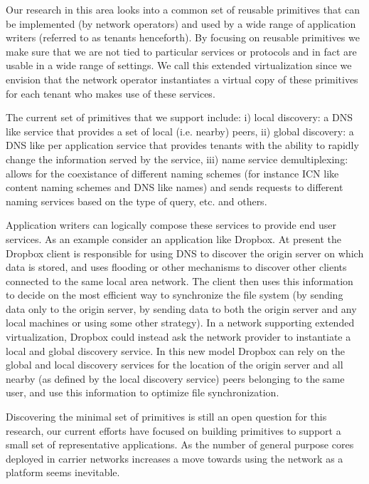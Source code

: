 \documentclass[letterpaper]{article}
\begin{document}
Our research in this area looks into a common set of reusable primitives that can be implemented (by network
operators) and used by a wide range of application writers (referred to as tenants henceforth). By focusing
on reusable primitives we make sure that we are not tied to particular services or protocols and in fact are
usable in a wide range of settings. We call this extended virtualization since we envision that the network
operator instantiates a virtual copy of these primitives for each tenant who makes use of these services.

The current set of primitives that we support include: i) local discovery: a DNS like service that provides a
set of local (i.e. nearby) peers, ii) global discovery: a DNS like per application service that provides
tenants with the ability to rapidly change the information served by the service, iii) name service
demultiplexing: allows for the coexistance of different naming schemes (for instance ICN like content naming
schemes and DNS like names) and sends requests to different naming services based on the type of query, etc.
and others.

Application writers can logically compose these services to provide end user services. As an example consider
an application like Dropbox. At present the Dropbox client is responsible for using DNS to discover the
origin server on which data is stored, and uses flooding or other mechanisms to discover other clients connected to
the same local area network. The client then uses this information to decide on the most efficient way to
synchronize the file system (by sending data only to the origin server, by sending data to both the origin
server and any local machines or using some other strategy). In a network supporting extended virtualization,
Dropbox could instead ask the network provider to instantiate a local and global discovery service. In this
new model Dropbox can rely on the global and local discovery services for the location of the origin server and
all nearby (as defined by the local discovery service) peers belonging to the same user, and use this
information to optimize file synchronization.

Discovering the minimal set of primitives is still an open question for this research, our current efforts
have focused on building primitives to support a small set of representative applications. As the number of
general purpose cores deployed in carrier networks increases a move towards using the network as a platform
seems inevitable.
\end{document}
